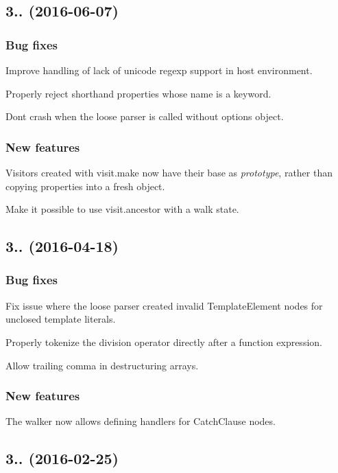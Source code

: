 \subsection*{3.. (2016-\/06-\/07)}

\subsubsection*{Bug fixes}

Improve handling of lack of unicode regexp support in host environment.

Properly reject shorthand properties whose name is a keyword.

Don\textquotesingle{}t crash when the loose parser is called without options object.

\subsubsection*{New features}

Visitors created with {\ttfamily visit.\+make} now have their base as {\itshape prototype}, rather than copying properties into a fresh object.

Make it possible to use {\ttfamily visit.\+ancestor} with a walk state.

\subsection*{3.. (2016-\/04-\/18)}

\subsubsection*{Bug fixes}

Fix issue where the loose parser created invalid Template\+Element nodes for unclosed template literals.

Properly tokenize the division operator directly after a function expression.

Allow trailing comma in destructuring arrays.

\subsubsection*{New features}

The walker now allows defining handlers for {\ttfamily Catch\+Clause} nodes.

\subsection*{3.. (2016-\/02-\/25)}

